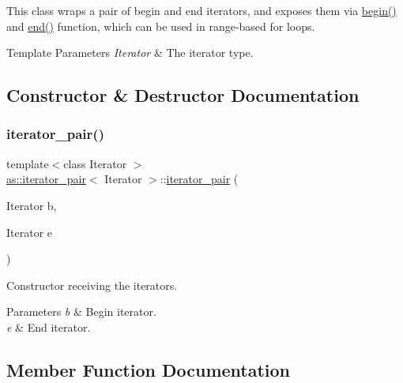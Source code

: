 This class wraps a pair of begin and end iterators, and exposes them via \hyperlink{classas_1_1iterator__pair_a88c00afafd5ee4477b7ab2a1a89bb746}{begin()} and \hyperlink{classas_1_1iterator__pair_ae7cef6e91faecd20e6aebd2f21b29b41}{end()} function, which can be used in range-\/based for loops. 


\begin{DoxyTemplParams}{Template Parameters}
{\em Iterator} & The iterator type. \\
\hline
\end{DoxyTemplParams}


\subsection{Constructor \& Destructor Documentation}
\mbox{\label{classas_1_1iterator__pair_a70030e7948493718b4baf500344a86e0}} 
\subsubsection{\texorpdfstring{iterator\+\_\+pair()}{iterator\_pair()}}
{\footnotesize\ttfamily template$<$class Iterator $>$ \\
\hyperlink{classas_1_1iterator__pair}{as\+::iterator\+\_\+pair}$<$ Iterator $>$\+::\hyperlink{classas_1_1iterator__pair}{iterator\+\_\+pair} (\begin{DoxyParamCaption}\item[{Iterator}]{b,  }\item[{Iterator}]{e }\end{DoxyParamCaption})\hspace{0.3cm}{\ttfamily [inline]}}



Constructor receiving the iterators. 


\begin{DoxyParams}{Parameters}
{\em b} & Begin iterator. \\
\hline
{\em e} & End iterator. \\
\hline
\end{DoxyParams}


\subsection{Member Function Documentation}
\mbox{\label{classas_1_1iterator__pair_a88c00afafd5ee4477b7ab2a1a89bb746}} 
